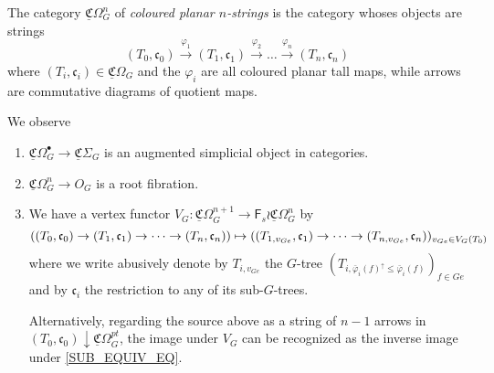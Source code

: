 \documentclass[a4paper,10pt
,draft
]{article}%
\renewcommand{\phi}{\varphi}
\newcommand{\UC}{\underline{\mathfrak C}}
\begin{document}
\begin{definition}
      The category $\UC\Omega_G^n$ of \textit{coloured planar $n$-strings} is the category
      whoses objects are strings
      \begin{equation}
            (T_0,\mathfrak c_0)
            \xrightarrow{\phi_1} (T_1, \mathfrak c_1)
            \xrightarrow{\phi_2} \ldots
            \xrightarrow{\phi_n} (T_n, \mathfrak c_n)
      \end{equation}
      where $(T_i, \mathfrak c_i) \in \UC\Omega_G$ and the $\phi_i$ are all coloured planar tall maps,
      while arrows are commutative diagrams of quotient maps.
\end{definition}

\begin{remark}
      We observe
      \begin{enumerate}
      \item $\UC\Omega_G^\bullet \to \UC\Sigma_G$ is an augmented simplicial object in categories.
      \item $\UC\Omega_G^n \to O_G$ is a root fibration.
      \item We have a vertex functor $V_G: \UC\Omega_G^{n+1} \to \mathsf F_s \wr \UC\Omega_G^n$ by
            \begin{equation}
                  \large(
                  (T_0,\mathfrak c_0)
                  \to (T_1, \mathfrak c_1)
                  \to \dots
                  \to (T_n, \mathfrak c_n)
                  \large)
                  \mapsto
                  \large(
                  (T_{1,v_{Ge}},\mathfrak c_1)
                  \to \dots \to
                  (T_{n,v_{Ge}}, \mathfrak c_n)
                  \large)_{v_{Ge} \in V_G(T_0)}
            \end{equation}
            where we write abusively denote by $T_{i,v_{Ge}}$ the $G$-tree $(T_{i,\bar\phi_i(f)^\uparrow \leq \bar\phi_i(f)})_{f \in Ge}$
            and by $\mathfrak c_i$ the restriction to any of its sub-$G$-trees.

            Alternatively, regarding the source above as a string of $n-1$ arrows in
            $(T_0, \mathfrak c_0) \downarrow \UC\Omega_G^{pt}$,
            the image under $V_G$ can be recognized as the inverse image under \eqref{SUB_EQUIV_EQ}.
      \end{enumerate}
\end{remark}
\end{document}

